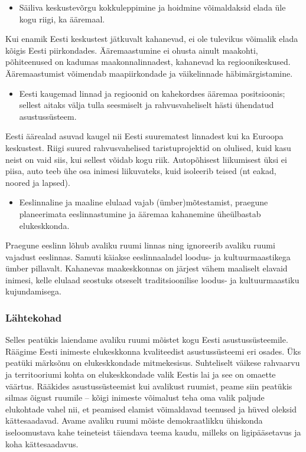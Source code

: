 \documentclass[estonian,]{article}
\providecommand{\tightlist}{%
  \setlength{\itemsep}{0pt}\setlength{\parskip}{0pt}}
\begin{document}
\begin{points}
\begin{itemize}
\tightlist
\item
  Säiliva keskustevõrgu kokkuleppimine ja hoidmine võimaldaksid elada
  üle kogu riigi, ka ääremaal.
\end{itemize}

Kui enamik Eesti keskustest jätkuvalt kahanevad, ei ole tulevikus
võimalik elada kõigis Eesti piirkondades. Ääremaastumine ei ohusta
ainult maakohti, põhiteenused on kadumas maakonnalinnadest, kahanevad ka
regioonikeskused. Ääremaastumist võimendab maapiirkondade ja
väikelinnade häbimärgistamine.

\begin{itemize}
\tightlist
\item
  Eesti kaugemad linnad ja regioonid on kahekordses ääremaa
  positsioonis; sellest aitaks välja tulla seesmiselt ja
  rahvusvaheliselt hästi ühendatud asustussüsteem.
\end{itemize}

Eesti äärealad asuvad kaugel nii Eesti suurematest linnadest kui ka
Euroopa keskustest. Riigi suured rahvusvahelised taristuprojektid on
olulised, kuid kasu neist on vaid siis, kui sellest võidab kogu riik.
Autopõhisest liikumisest üksi ei piisa, auto teeb ühe osa inimesi
liikuvateks, kuid isoleerib teised (nt eakad, noored ja lapsed).

\begin{itemize}
\tightlist
\item
  Eeslinnaline ja maaline elulaad vajab (ümber)mõtestamist, praegune
  planeerimata eeslinnastumine ja ääremaa kahanemine üheülbastab
  elukeskkonda.
\end{itemize}

Praegune eeslinn lõhub avaliku ruumi linnas ning ignoreerib avaliku
ruumi vajadust eeslinnas. Samuti käiakse eeslinnaaladel loodus- ja
kultuurmaastikega ümber pillavalt. Kahanevas maakeskkonnas on järjest
vähem maaliselt elavaid inimesi, kelle elulaad seostuks otseselt
traditsioonilise loodus- ja kultuurmaastiku kujundamisega.
\end{points}

\hypertarget{luxe4htekohad}{%
\subsubsection*{Lähtekohad}\label{luxe4htekohad}}

Selles peatükis laiendame avaliku ruumi mõistet kogu Eesti asustussüsteemile. Räägime Eesti inimeste elukeskkonna kvaliteedist asustussüsteemi eri osades. Üks peatüki märksõnu on elukeskkondade mitmekesisus. Suhteliselt väikese rahvaarvu ja territooriumi kohta on elukeskkondade valik Eestis lai ja see on omaette väärtus. Rääkides asustussüsteemist kui avalikust ruumist, peame siin peatükis silmas õigust ruumile -- kõigi inimeste võimalust teha oma valik paljude elukohtade vahel nii, et peamised elamist võimaldavad teenused ja hüved oleksid kättesaadavad. Avame avaliku ruumi mõiste demokraatlikku ühiskonda iseloomustava kahe teineteist täiendava teema kaudu, milleks on ligipääsetavus ja koha kättesaadavus.
\end{document}

